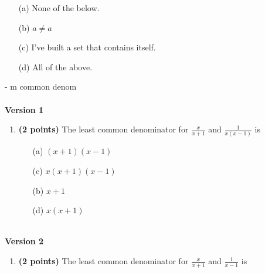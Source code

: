\documentclass[12pt]{amsart}
\begin{document}
\begin{enumerate}[resume]
\begin{minipage}[t]{1.0\linewidth}\begin{itemize}\item[(a)]  None of the below.  \item[(b)]  $a \neq a$ \item[(c)]  I've built a set that contains itself. \item[(d)]   All of the above. \end{itemize}\end{minipage} \vfill \end{enumerate} - m common denom \\$ $ \\ {\bf Version 1} \\\begin{enumerate}[resume]
\item {\bf (2 points)} 
 The least common denominator for $\displaystyle \frac{x}{x+1}$ and $\displaystyle \frac{1}{x(x-1)}$ is \vspace{.2cm}

\begin{minipage}[t]{1.0\linewidth}\begin{multicols}{2}\begin{itemize}\item[(a)]  $(x+1)(x-1)$ \item[(c)]  $x(x+1)(x-1)$ \item[(b)]  $x+1$ \item[(d)]  $x(x+1)$ \end{itemize}\end{multicols}\end{minipage} \vfill \end{enumerate}$ $ \\ {\bf Version 2} \\\begin{enumerate}[resume]
\item {\bf (2 points)} 
 The least common denominator for $\displaystyle \frac{x}{x+1}$ and $\displaystyle \frac{1}{x-1}$ is \vspace{.2cm}


\end{enumerate}
\end{document}

